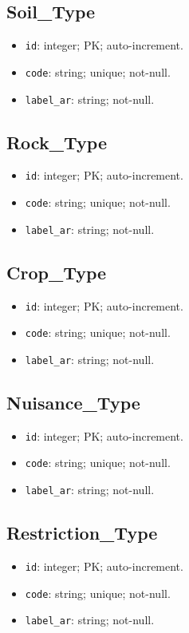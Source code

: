 \documentclass[12pt,oneside]{report}
\begin{document}
\subsection{Soil\_Type}
\begin{itemize}[leftmargin=*,itemsep=2pt]
  \item \texttt{id}: integer; PK; auto-increment.
  \item \texttt{code}: string; unique; not-null.
  \item \texttt{label\_ar}: string; not-null.
\end{itemize}

\subsection{Rock\_Type}
\begin{itemize}[leftmargin=*,itemsep=2pt]
  \item \texttt{id}: integer; PK; auto-increment.
  \item \texttt{code}: string; unique; not-null.
  \item \texttt{label\_ar}: string; not-null.
\end{itemize}

\subsection{Crop\_Type}
\begin{itemize}[leftmargin=*,itemsep=2pt]
  \item \texttt{id}: integer; PK; auto-increment.
  \item \texttt{code}: string; unique; not-null.
  \item \texttt{label\_ar}: string; not-null.
\end{itemize}

\subsection{Nuisance\_Type}
\begin{itemize}[leftmargin=*,itemsep=2pt]
  \item \texttt{id}: integer; PK; auto-increment.
  \item \texttt{code}: string; unique; not-null.
  \item \texttt{label\_ar}: string; not-null.
\end{itemize}

\subsection{Restriction\_Type}
\begin{itemize}[leftmargin=*,itemsep=2pt]
  \item \texttt{id}: integer; PK; auto-increment.
  \item \texttt{code}: string; unique; not-null.
  \item \texttt{label\_ar}: string; not-null.
\end{itemize}
\end{document}
